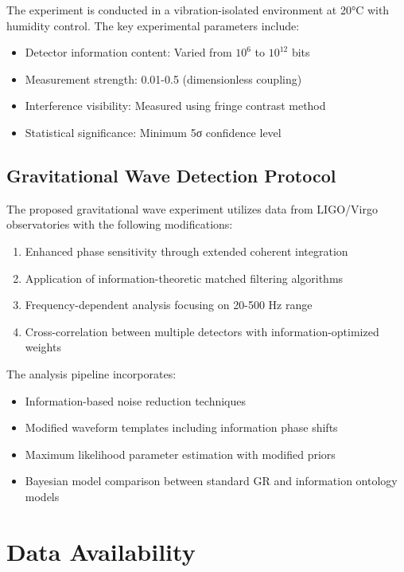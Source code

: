 \documentclass[12pt,letterpaper]{article}
\begin{document}
The experiment is conducted in a vibration-isolated environment at 20°C with humidity control. The key experimental parameters include:

\begin{itemize}
\item Detector information content: Varied from $10^6$ to $10^{12}$ bits
\item Measurement strength: 0.01-0.5 (dimensionless coupling)
\item Interference visibility: Measured using fringe contrast method
\item Statistical significance: Minimum 5σ confidence level
\end{itemize}

\subsection{Gravitational Wave Detection Protocol}

The proposed gravitational wave experiment utilizes data from LIGO/Virgo observatories with the following modifications:

\begin{enumerate}
\item Enhanced phase sensitivity through extended coherent integration
\item Application of information-theoretic matched filtering algorithms
\item Frequency-dependent analysis focusing on 20-500 Hz range
\item Cross-correlation between multiple detectors with information-optimized weights
\end{enumerate}

The analysis pipeline incorporates:

\begin{itemize}
\item Information-based noise reduction techniques
\item Modified waveform templates including information phase shifts
\item Maximum likelihood parameter estimation with modified priors
\item Bayesian model comparison between standard GR and information ontology models
\end{itemize}

\section{Data Availability}
\end{document}
